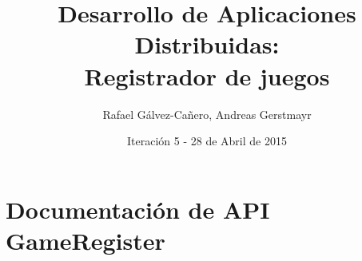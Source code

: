 \documentclass[12pt,a4paper]{report}
\title{Desarrollo de Aplicaciones Distribuidas: \\ Registrador de juegos}
\author{Rafael Gálvez-Cañero, Andreas Gerstmayr}
\date{Iteración 5 - 28 de Abril de 2015} %
\begin{document}
\maketitle
\tableofcontents
\listoffigures
\listoftables











 





\chapter{Documentación de API GameRegister}

\end{document}
